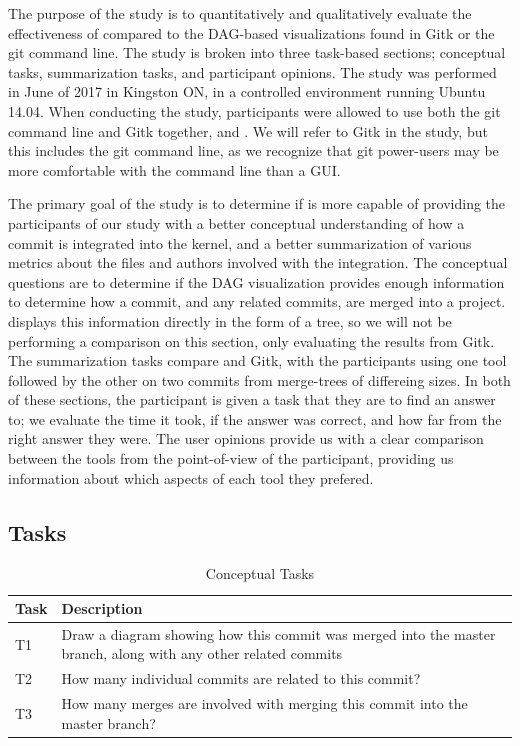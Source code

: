 The purpose of the study is to quantitatively and qualitatively evaluate
the effectiveness of \tool compared to the DAG-based visualizations
found in Gitk or the git command line. The study is broken into three
task-based sections; conceptual tasks, summarization tasks, and
participant opinions. The study was performed in June of 2017 in
Kingston ON, in a controlled environment running Ubuntu 14.04. When
conducting the study, participants were allowed to use both the git
command line and Gitk together, and \tool. We will refer to Gitk in the
study, but this includes the git command line, as we recognize that git
power-users may be more comfortable with the command line than a GUI.

The primary goal of the study is to determine if \tool is more capable
of providing the participants of our study with a better conceptual
understanding of how a commit is integrated into the kernel, and a
better summarization of various metrics about the files and authors
involved with the integration. The conceptual questions are to determine
if the DAG visualization provides enough information to determine how a
commit, and any related commits, are merged into a project. \tool
displays this information directly in the form of a tree, so we will not
be performing a comparison on this section, only evaluating the results
from Gitk. The summarization tasks compare \tool and Gitk, with the
participants using one tool followed by the other on two commits from
merge-trees of differeing sizes. In both of these sections, the
participant is given a task that they are to find an answer to; we
evaluate the time it took, if the answer was correct, and how far from
the right answer they were. The user opinions provide us with a clear
comparison between the tools from the point-of-view of the participant,
providing us information about which aspects of each tool they prefered.


\subsection{Tasks}
\label{sub:tasks}



\begin{table}[htpb]
  \centering
  \caption{Conceptual Tasks }
  \label{tab:conceptual_tasks}
  \begin{tabulary}{0.9\textwidth}{LL}
    \toprule
    Task & Description\\
    \midrule
    T1 & Draw a diagram showing how this commit was merged into the master branch, along with any other related commits\\
    T2 & How many individual commits are related to this commit?\\
    T3 & How many merges are involved with merging this commit into the master branch?\\
    \bottomrule
  \end{tabulary}
\end{table}

